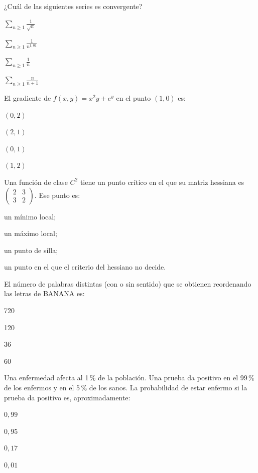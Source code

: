 \begin{cuestiones}
\item {} ¿Cuál de las siguientes series es convergente?
\begin{opciones}
  \item $\displaystyle\sum_{n\ge1}\frac{1}{\sqrt n}$
  \item $\displaystyle\sum_{n\ge1}\frac{1}{n^{1{,}01}}$
  \item $\displaystyle\sum_{n\ge1}\frac{1}{n}$
  \item $\displaystyle\sum_{n\ge1}\frac{n}{n+1}$
\end{opciones}

\item {} El gradiente de $f(x,y)=x^{2}y+e^{y}$ en el punto $(1,0)$ es:
\begin{opciones}
  \item $(0,2)$
  \item $(2,1)$
  \item $(0,1)$
  \item $(1,2)$
\end{opciones}

\item {} Una función de clase $C^{2}$ tiene un punto crítico en el que su matriz hessiana es $\begin{pmatrix}2&3\\3&2\end{pmatrix}$. Ese punto es:
\begin{opciones}
  \item un mínimo local;
  \item un máximo local;
  \item un punto de silla;
  \item un punto en el que el criterio del hessiano no decide.
\end{opciones}

\item {} El número de palabras distintas (con o sin sentido) que se obtienen reordenando las letras de BANANA es:
\begin{opciones}
  \item 720
  \item 120
  \item 36
  \item 60
\end{opciones}

\item {} Una enfermedad afecta al 1\,\% de la población. Una prueba da positivo en el 99\,\% de los enfermos y en el 5\,\% de los sanos. La probabilidad de estar enfermo si la prueba da positivo es, aproximadamente:
\begin{opciones}
  \item $0{,}99$
  \item $0{,}95$
  \item $0{,}17$
  \item $0{,}01$
\end{opciones}


\end{cuestiones}
